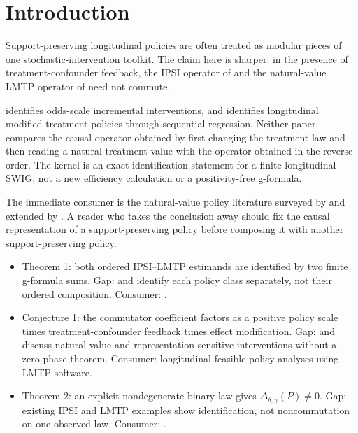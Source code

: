 \documentclass[11pt]{article}
\theoremstyle{definition}
\theoremstyle{plain}
\theoremstyle{remark}
\begin{document}
\section{Introduction}
Support-preserving longitudinal policies are often treated as modular pieces of one stochastic-intervention toolkit. The claim here is sharper: in the presence of treatment-confounder feedback, the IPSI operator of \citet[Section 2, ``multiply the odds'']{Kennedy2019JASA} and the natural-value LMTP operator of \citet[Section 2, ``longitudinal modified treatment policies'']{DiazWilliamsHoffmanSchenck2023JASA} need not commute.

\citet[Section 2]{Kennedy2019JASA} identifies odds-scale incremental interventions, and \citet[Section 3]{DiazWilliamsHoffmanSchenck2023JASA} identifies longitudinal modified treatment policies through sequential regression. Neither paper compares the causal operator obtained by first changing the treatment law and then reading a natural treatment value with the operator obtained in the reverse order. The kernel is an exact-identification statement for a finite longitudinal SWIG, not a new efficiency calculation or a positivity-free g-formula.

The immediate consumer is the natural-value policy literature surveyed by \citet{YoungHernanRobins2014EM} and extended by \citet{WenMarcusYoung2023SMMR}. A reader who takes the conclusion away should fix the causal representation of a support-preserving policy before composing it with another support-preserving policy.

\begin{itemize}[leftmargin=*]
\item Theorem 1: both ordered IPSI--LMTP estimands are identified by two finite g-formula sums. Gap: \citet{Kennedy2019JASA} and \citet{DiazWilliamsHoffmanSchenck2023JASA} identify each policy class separately, not their ordered composition. Consumer: \citet{WenMarcusYoung2023SMMR}.
\item Conjecture 1: the commutator coefficient factors as a positive policy scale times treatment-confounder feedback times effect modification. Gap: \citet{YoungHernanRobins2014EM} and \citet{WenMarcusYoung2023SMMR} discuss natural-value and representation-sensitive interventions without a zero-phase theorem. Consumer: longitudinal feasible-policy analyses using LMTP software.
\item Theorem 2: an explicit nondegenerate binary law gives \(\Delta_{\delta,\gamma}(P)\ne0\). Gap: existing IPSI and LMTP examples show identification, not noncommutation on one observed law. Consumer: \citet{SarvetWanisYoungHernandezAlejandroStensrud2023Biometrics}.
\end{itemize}
\end{document}
